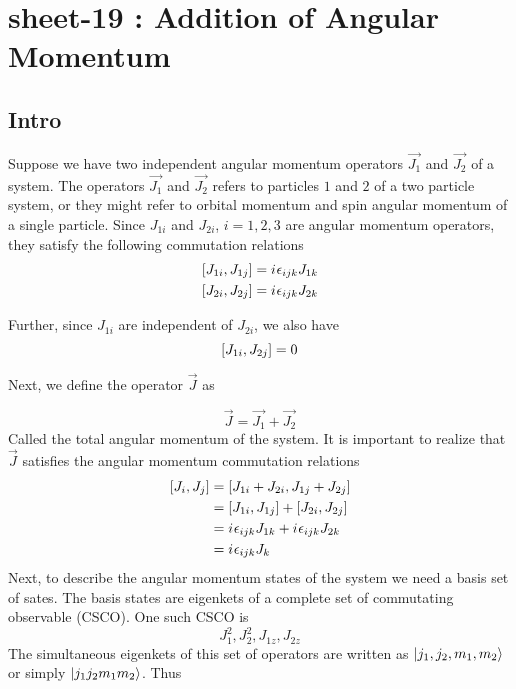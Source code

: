 

\chapter{sheet-19 : Addition of Angular Momentum}

\ifpdf
\graphicspath{{Chapter19/figs/}}
\else
\graphicspath{{Chapter19/figs/}}
\fi

\section{Intro}
Suppose we have two independent angular momentum operators $\vec{J_1}$ and $\vec{J_2}$ of a system. The operators $\vec{J_1}$ and $\vec{J_2}$ refers to particles $1$ and $2$ of a two particle system, or they might refer to orbital momentum and spin angular momentum of a single particle. Since $J_{1 i}$ and $J_{2 i}$, $i=1,2,3$ are angular momentum operators, they satisfy the following commutation relations
\begin{align}
\label{chapter19-eqn1}
\comm{J_{1 i}}{J_{1 j}} &= \iu \epsilon_{i j k} J_{1 k} \\
\label{chapter19-eqn2}
\comm{J_{2 i}}{J_{2 j}} &= \iu \epsilon_{i j k} J_{2 k}
\end{align}

Further, since $J_{1 i}$ are independent of $J_{2 i}$, we also have
\begin{equation}
\comm{J_{1 i}}{J_{2 j}} = 0
\end{equation}

Next, we define the operator $\vec{J}$ as

\begin{equation}
\vec{J} = \vec{J_1} + \vec{J_2}
\end{equation}
Called the total angular momentum of the system. It is important to realize that $\vec{J}$ satisfies the angular momentum commutation relations
\begin{align*}
\comm{J_i}{J_j} 
&= \comm{J_{1 i} + J_{2 i}}{J_{1 j} + J_{2 j}} \\
&= \comm{J_{1 i}}{J_{1 j}} + \comm{J_{2 i}}{J_{2 j}} \\
&= \iu \epsilon_{i j k} J_{1 k} + \iu \epsilon_{i j k} J_{2 k} \\
&= \iu \epsilon_{i j k} J_{k}
\end{align*}
Next, to describe the angular momentum states of the system we need a basis set of sates. The basis states are eigenkets of a complete set of commutating observable (CSCO). One such CSCO is
\begin{equation*}
J_1^2, J_2^2, J_{1 z}, J_{2 z}
\end{equation*}
The simultaneous eigenkets of this set of operators are written as $\ket{j_1,j_2,m_1,m_2}$ or simply $\ket{j_1 j_2 m_1 m_2}$. Thus


